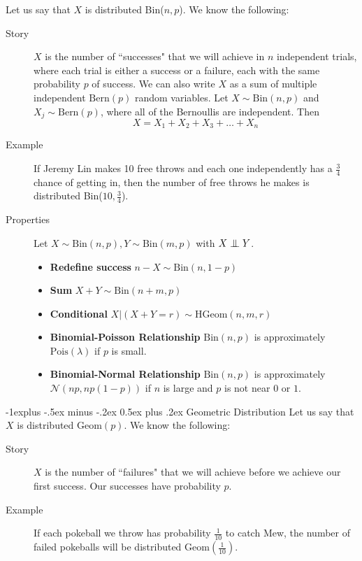\documentclass[10pt,landscape]{article}
\makeatletter
\newcommand\independent{\protect\mathpalette{\protect\independenT}{\perp}}
\def\independenT#1#2{\mathrel{\setbox0\hbox{$#1#2$}%
    \copy0\kern-\wd0\mkern4mu\box0}}
\newcommand{\N}{\mathcal{N}}
\newcommand{\Bern}{\textrm{Bern}}
\newcommand{\Bin}{\textrm{Bin}}
\newcommand{\Pois}{\textrm{Pois}}
\newcommand{\Geom}{\textrm{Geom}}
\newcommand{\HGeom}{\textrm{HGeom}}
\renewcommand{\subsection}{\@startsection{subsection}{2}{0mm}%
                                {-1explus -.5ex minus -.2ex}%
                                {0.5ex plus .2ex}%
                                {\normalfont\normalsize\bfseries}}
\makeatother
\begin{document}
\begin{multicols*}{3}
Let us say that $X$ is distributed \Bin($n,p$). We know the following:
\begin{description}
    \item[Story] $X$ is the number of ``successes" that we will achieve in $n$ independent trials, where each trial is either a success or a failure, each with the same probability $p$ of success. We can also write $X$ as a sum of multiple independent $\Bern(p)$ random variables. Let $X \sim \Bin(n, p)$ and $X_j \sim \Bern(p)$, where all of the Bernoullis are independent. Then
        \[X = X_1 + X_2 + X_3 + \dots + X_n\]
    \item[Example] If Jeremy Lin makes 10 free throws and each one independently has a $\frac{3}{4}$ chance of getting in, then the number of free throws he makes is distributed  \Bin($10,\frac{3}{4}$).
\item[Properties] Let $X \sim \Bin(n,p), Y \sim \Bin(m,p)$ with $X \independent Y$.
\begin{itemize}
\item \textbf{Redefine success} $n-X \sim \Bin(n,1-p)$
\item \textbf{Sum} $X+Y \sim \Bin(n+m,p)$
\item \textbf{Conditional} $X|(X+Y=r) \sim \HGeom(n,m,r)$
 \item \textbf{Binomial-Poisson Relationship} $\Bin(n, p)$ is approximately  $\Pois(\lambda)$ if $p$ is small.
   \item \textbf{Binomial-Normal Relationship} $\Bin(n, p)$ is approximately $\N(np,np(1-p))$ if $n$ is large and $p$ is not near $0$ or $1$.
  \end{itemize}
\end{description}

\subsection{Geometric Distribution} Let us say that $X$ is distributed $\Geom(p)$. We know the following:
\begin{description}
    \item[Story] $X$ is the number of ``failures" that we will achieve before we achieve our first success. Our successes have probability $p$.
    \item[Example] If each pokeball we throw has probability  $\frac{1}{10}$ to catch Mew, the number of failed pokeballs will be distributed $\Geom(\frac{1}{10})$.
\end{description}


\end{multicols*}
\end{document}
